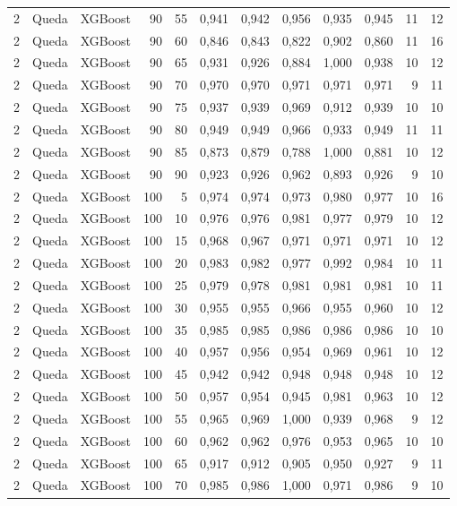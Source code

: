 \begin{longtable}{@{}rllrrrrrrrrr@{}}
2 & Queda & XGBoost & 90 & 55 & 0,941 & 0,942 & 0,956 & 0,935 & 0,945 & 11 & 12 \\
2 & Queda & XGBoost & 90 & 60 & 0,846 & 0,843 & 0,822 & 0,902 & 0,860 & 11 & 16 \\
2 & Queda & XGBoost & 90 & 65 & 0,931 & 0,926 & 0,884 & 1,000 & 0,938 & 10 & 12 \\
2 & Queda & XGBoost & 90 & 70 & 0,970 & 0,970 & 0,971 & 0,971 & 0,971 & 9 & 11 \\
2 & Queda & XGBoost & 90 & 75 & 0,937 & 0,939 & 0,969 & 0,912 & 0,939 & 10 & 10 \\
2 & Queda & XGBoost & 90 & 80 & 0,949 & 0,949 & 0,966 & 0,933 & 0,949 & 11 & 11 \\
2 & Queda & XGBoost & 90 & 85 & 0,873 & 0,879 & 0,788 & 1,000 & 0,881 & 10 & 12 \\
2 & Queda & XGBoost & 90 & 90 & 0,923 & 0,926 & 0,962 & 0,893 & 0,926 & 9 & 10 \\
2 & Queda & XGBoost & 100 & 5 & 0,974 & 0,974 & 0,973 & 0,980 & 0,977 & 10 & 16 \\
2 & Queda & XGBoost & 100 & 10 & 0,976 & 0,976 & 0,981 & 0,977 & 0,979 & 10 & 12 \\
2 & Queda & XGBoost & 100 & 15 & 0,968 & 0,967 & 0,971 & 0,971 & 0,971 & 10 & 12 \\
2 & Queda & XGBoost & 100 & 20 & 0,983 & 0,982 & 0,977 & 0,992 & 0,984 & 10 & 11 \\
2 & Queda & XGBoost & 100 & 25 & 0,979 & 0,978 & 0,981 & 0,981 & 0,981 & 10 & 11 \\
2 & Queda & XGBoost & 100 & 30 & 0,955 & 0,955 & 0,966 & 0,955 & 0,960 & 10 & 12 \\
2 & Queda & XGBoost & 100 & 35 & 0,985 & 0,985 & 0,986 & 0,986 & 0,986 & 10 & 10 \\
2 & Queda & XGBoost & 100 & 40 & 0,957 & 0,956 & 0,954 & 0,969 & 0,961 & 10 & 12 \\
2 & Queda & XGBoost & 100 & 45 & 0,942 & 0,942 & 0,948 & 0,948 & 0,948 & 10 & 12 \\
2 & Queda & XGBoost & 100 & 50 & 0,957 & 0,954 & 0,945 & 0,981 & 0,963 & 10 & 12 \\
2 & Queda & XGBoost & 100 & 55 & 0,965 & 0,969 & 1,000 & 0,939 & 0,968 & 9 & 12 \\
2 & Queda & XGBoost & 100 & 60 & 0,962 & 0,962 & 0,976 & 0,953 & 0,965 & 10 & 10 \\
2 & Queda & XGBoost & 100 & 65 & 0,917 & 0,912 & 0,905 & 0,950 & 0,927 & 9 & 11 \\
2 & Queda & XGBoost & 100 & 70 & 0,985 & 0,986 & 1,000 & 0,971 & 0,986 & 9 & 10 \\

\end{longtable}

